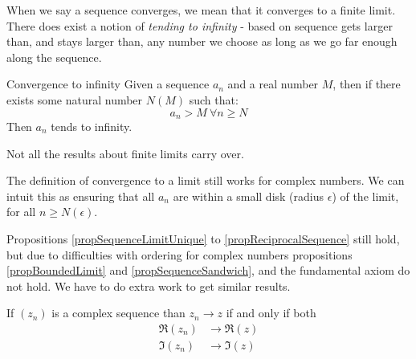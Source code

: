\documentclass[../Main.tex]{subfiles}
\begin{document}
\begin{remark}
    When we say a sequence converges, we mean that it converges to a finite limit. There does exist a notion of \textit{tending to infinity} - based on sequence gets larger than, and stays larger than, any number we choose as long as we go far enough along the sequence.
\end{remark}
\begin{definition}{Convergence to infinity}
    Given a sequence $a_n$ and a real number $M$, then if there exists some natural number $N(M)$ such that:
    \begin{equation*}
        a_n > M~\forall n \geq N
    \end{equation*}
    Then $a_n$ tends to infinity.
\end{definition}
\begin{warning}
    Not all the results about finite limits carry over.
\end{warning}
\begin{remark}
    The definition of convergence to a limit still works for complex numbers. We can intuit this as ensuring that all $a_n$ are within a small disk (radius $\epsilon$) of the limit, for all $n \geq N(\epsilon)$.\par
    Propositions \ref{propSequenceLimitUnique} to \ref{propReciprocalSequence} still hold, but due to difficulties with ordering for complex numbers propositions \ref{propBoundedLimit} and \ref{propSequenceSandwich}, and the fundamental axiom do not hold. We have to do extra work to get similar results.
\end{remark}
\begin{lemma}
    If $(z_n)$ is a complex sequence than $z_n \rightarrow z$ if and only if both
    \begin{align*}
        \Re(z_n) &\rightarrow \Re(z) \\
        \Im(z_n) &\rightarrow \Im(z)
    \end{align*}
    \label{lemComplexConvergence}
\end{lemma}
\end{document}
